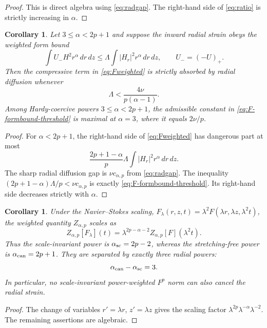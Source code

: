 \documentclass[11pt]{article}
\numberwithin{equation}{section}
\newtheorem{corollary}[theorem]{Corollary}
\theoremstyle{remark}
\begin{document}
\begin{proof}
This is direct algebra using \eqref{eq:radgap}.  The right-hand side of \eqref{eq:ratio} is strictly increasing in \(\alpha\).
\end{proof}

\begin{corollary}\label{cor:F-formbound}
Let \(3\le\alpha<2p+1\) and suppose the inward radial strain obeys the weighted form bound
\begin{equation}\label{eq:F-formbound}
 \int U_-H^2r^\alpha\,dr\,dz
 \le \Lambda\int|H_r|^2r^\alpha\,dr\,dz,
 \qquad U_-=(-U)_+.
\end{equation}
Then the compressive term in \eqref{eq:Fweighted} is strictly absorbed by radial diffusion whenever
\begin{equation}\label{eq:F-formbound-threshold}
 \Lambda<\frac{4\nu}{p(\alpha-1)}.
\end{equation}
Among Hardy-coercive powers \(3\le\alpha<2p+1\), the admissible constant in \eqref{eq:F-formbound-threshold} is maximal at \(\alpha=3\), where it equals \(2\nu/p\).
\end{corollary}

\begin{proof}
For \(\alpha<2p+1\), the right-hand side of \eqref{eq:Fweighted} has dangerous part at most
\[
 \frac{2p+1-\alpha}{p}\Lambda
 \int |H_r|^2r^\alpha\,dr\,dz.
\]
The sharp radial diffusion gap is \(\nu c_{\alpha,p}\) from \eqref{eq:radgap}.  The inequality
\((2p+1-\alpha)\Lambda/p<\nu c_{\alpha,p}\) is exactly \eqref{eq:F-formbound-threshold}.  Its right-hand side decreases strictly with \(\alpha\).
\end{proof}

\begin{corollary}\label{cor:scaling-gap}
Under the Navier--Stokes scaling,
\(F_\lambda(r,z,t)=\lambda^2F(\lambda r,\lambda z,\lambda^2t)\), the weighted quantity \(Z_{\alpha,p}\) scales as
\[
 Z_{\alpha,p}[F_\lambda](t)
 =\lambda^{2p-\alpha-2}Z_{\alpha,p}[F](\lambda^2t).
\]
Thus the scale-invariant power is \(\alpha_{\rm sc}=2p-2\), whereas the stretching-free power is \(\alpha_{\rm can}=2p+1\).  They are separated by exactly three radial powers:
\[
 \alpha_{\rm can}-\alpha_{\rm sc}=3.
\]
In particular, no scale-invariant power-weighted \(F^p\) norm can also cancel the radial strain.
\end{corollary}

\begin{proof}
The change of variables \(r'=\lambda r\), \(z'=\lambda z\) gives the scaling factor \(\lambda^{2p}\lambda^{-\alpha}\lambda^{-2}\).  The remaining assertions are algebraic.
\end{proof}
\end{document}
